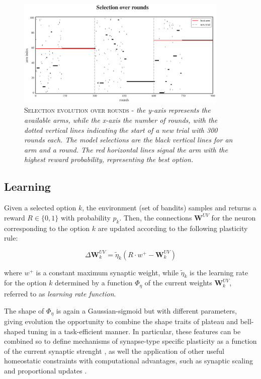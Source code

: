 \begin{figure}[ht]
    \centering
    \includegraphics[width=0.9\textwidth]{figures/selections_2.png}
    \caption{\textsc{Selection evolution over rounds} - \textit{the y-axis represents the available arms, while the x-axis the number of rounds, with the dotted vertical lines indicating the start of a new trial with 300 rounds each.
The model selections are the black vertical lines for an arm and a round. The red horizontal lines signal the arm with the highest reward probability, representing the best option.}}
    \label{fig:sel1}
\end{figure}


\subsection{Learning}
Given a selected option $k$, the environment (set of bandits) samples and returns a reward $R\in \{0, 1\}$ with probability $p_{k}$.
Then, the connections $\textbf{W}^{UV}$ for the neuron corresponding to the option $k$ are updated according to the following plasticity rule:

\begin{equation}
    \Delta \textbf{W}^{UV}_{k} = \tilde{\eta}_{k} \left(R\cdot w^{+}- \textbf{W}^{UV}_{k}\right)
\end{equation}

\noindent where $w^{+}$ is a constant maximum synaptic weight, while $\tilde{\eta}_{k}$ is the learning rate for the option $k$ determined by a function $\Phi_{\eta}$ of the current weights $\textbf{W}^{UV}_{k}$, referred to as \textit{learning rate function}.

The shape of $\Phi_{\eta}$ is again a Gaussian-sigmoid but with different parameters, giving evolution the opportunity to combine the shape traits of plateau and bell-shaped tuning in a task-efficient manner.
In particular, these features can be combined so to define mechanisms of synapse-type specific plasticity as a function of the current synaptic strenght \cite{larsenSynapsetypespecificPlasticityLocal2015}, as well the application of other useful homeostatic constraints with computational advantages, such as synaptic scaling and proportional updates \cite{citriSynapticPlasticityMultiple2008, kennedySynapticSignalingLearning2016, samavatSynapticInformationStorage2024}.


